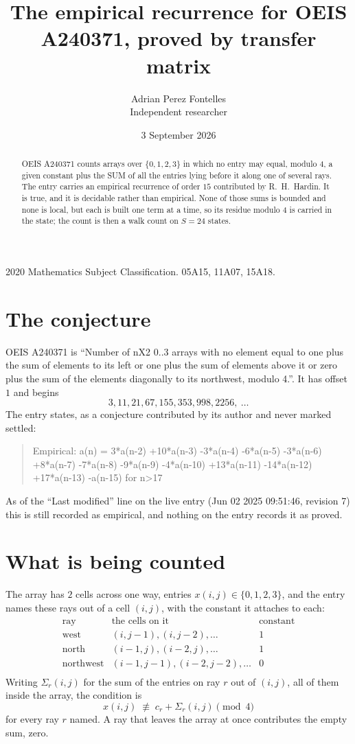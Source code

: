 \documentclass[11pt,a4paper]{article}
\title{The empirical recurrence for OEIS A240371, proved by transfer matrix}
\author{Adrian Perez Fontelles\\ \small Independent researcher}
\date{3 September 2026}
\theoremstyle{plain}
\theoremstyle{definition}
\begin{document}
\maketitle

\begin{abstract}
OEIS A240371 counts arrays over $\{0,1,2,3\}$ in which no entry may equal, modulo $4$, a given
constant plus the SUM of all the entries lying before it along one of several rays. The entry
carries an empirical recurrence of order $15$ contributed by R.~H.~Hardin. It is true, and
it is decidable rather than empirical. None of those sums is bounded and none is local, but
each is built one term at a time, so its residue modulo $4$ is carried in the state; the
count is then a walk count on $S=24$ states.
\end{abstract}

\noindent\small 2020 Mathematics Subject Classification. 05A15, 11A07, 15A18.\normalsize

\section{The conjecture}

OEIS A240371 is ``Number of nX2 0..3 arrays with no element equal to one plus the sum of elements to its left or one plus the sum of elements above it or zero plus the sum of the elements diagonally to its northwest, modulo 4.''. It has offset $1$ and begins
\[
3, 11, 21, 67, 155, 353, 998, 2256,\ \dots
\]
The entry states, as a conjecture contributed by its author and never marked settled:
\begin{quote}
Empirical: a(n) = 3*a(n-2) +10*a(n-3) -3*a(n-4) -6*a(n-5) -3*a(n-6) +8*a(n-7) -7*a(n-8) -9*a(n-9) -4*a(n-10) +13*a(n-11) -14*a(n-12) +17*a(n-13) -a(n-15) for n>17
\end{quote}
As of the ``Last modified'' line on the live entry (Jun 02 2025 09:51:46, revision 7) this is still
recorded as empirical, and nothing on the entry records it as proved.

\section{What is being counted}

The array has $2$ cells across one way, entries $x(i,j)\in\{0,1,2,3\}$, and the entry names these
rays out of a cell $(i,j)$, with the constant it attaches to each:
\[
\begin{array}{lll}
\text{ray} & \text{the cells on it} & \text{constant} \\[2pt]
\text{west} & (i,j-1),(i,j-2),\dots & 1 \\
\text{north} & (i-1,j),(i-2,j),\dots & 1 \\
\text{northwest} & (i-1,j-1),(i-2,j-2),\dots & 0 \\
\end{array}
\]
Writing $\Sigma_r(i,j)$ for the sum of the entries on ray $r$ out of $(i,j)$, all of them
inside the array, the condition is
\[
x(i,j)\;\not\equiv\;c_r+\Sigma_r(i,j) \pmod{4}
\]
for every ray $r$ named. A ray that leaves the array at once contributes the empty sum,
zero.
\end{document}
